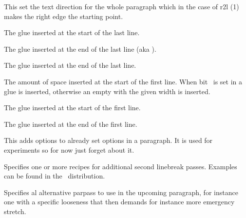 This set the text direction for the whole paragraph which in the case of \type
{r2l} (1) makes the right edge the starting point.

\stopnewprimitive

\startnewprimitive[title={\prm {parfillleftskip}}]

The glue inserted at the start of the last line.

\stopnewprimitive

\startnewprimitive[title={\prm {parfillrightskip}}]

The glue inserted at the end of the last line (aka ).

\stopnewprimitive

\startoldprimitive[title={\prm {parfillskip}}]

The glue inserted at the end of the last line.

\stopoldprimitive

\startoldprimitive[title={\prm {parindent}}]

The amount of space inserted at the start of the first line. When bit \tobit
{}\ is set in  a glue is
inserted, otherwise an empty  with the given width is inserted.

\stopoldprimitive

\startnewprimitive[title={\prm {parinitleftskip}}]

The glue inserted at the start of the first line.

\stopnewprimitive

\startnewprimitive[title={\prm {parinitrightskip}}]

The glue inserted at the end of the first line.

\stopnewprimitive

\startnewprimitive[title={\prm {paroptions}}]

This adds options to already set options in a paragraph. It is used for
experiments so for now just forget about it.

\stopnewprimitive

\startnewprimitive[title={\prm {parpasses}}]

Specifies one or more recipes for additional second linebreak passes. Examples
can be found in the \CONTEXT\ distribution.

\stopnewprimitive

\startnewprimitive[title={\prm {parpassesexception}}]

Specifies al alternative parpass to use in the upcoming paragraph, for instance
one with a specific looseness that then demands for instance more emergency
stretch.

